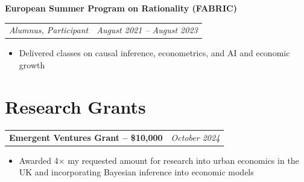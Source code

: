 \documentclass[legalpaper,11pt]{article}
\makeatletter
\newcommand{\resumeSection}[1]{
    \vspace{-9pt}
    \section{#1}
}
\newcommand{\resumeItem}[1]{
  \item\small{#1}
  \vspace{-3pt}
}
\newcommand{\resumeSubheading}[1]{
  \textbf{#1}\\
  \vspace{-1pt}
}
\newcommand{\jobtitleanddate}[2]{
  \begin{tabular*}{0.97\textwidth}{l@{\extracolsep{\fill}}r}
    \textit{\small#1} & \textit{\small#2} \\
  \end{tabular*}\vspace{-4pt}
}
\newcommand{\resumeSubheadingNoJob}[2]{
  \begin{tabular*}{0.97\textwidth}{l@{\extracolsep{\fill}}r}
    \textbf{#1} & \textit{\small#2} \\
  \end{tabular*}
  \vspace{-5pt} %
}
\newcommand{\resumeItemListStart}{\begin{itemize}}
\newcommand{\resumeItemListEnd}{\end{itemize}}
\makeatother
\begin{document}
    \resumeSubheading{European Summer Program on Rationality (FABRIC)}
    \jobtitleanddate{Alumnus, Participant}{August 2021 -- August 2023}
        \resumeItemListStart
            \resumeItem{Delivered classes on causal inference, econometrics, and AI and economic growth}
    \resumeItemListEnd

\resumeSection{Research Grants}
    \resumeSubheadingNoJob{Emergent Ventures Grant -- \$10,000}{October 2024}
        \resumeItemListStart
            \resumeItem{Awarded 4$\times$ my requested amount for research into urban economics in the UK and incorporating Bayesian inference into economic models}
        \resumeItemListEnd
\end{document}
